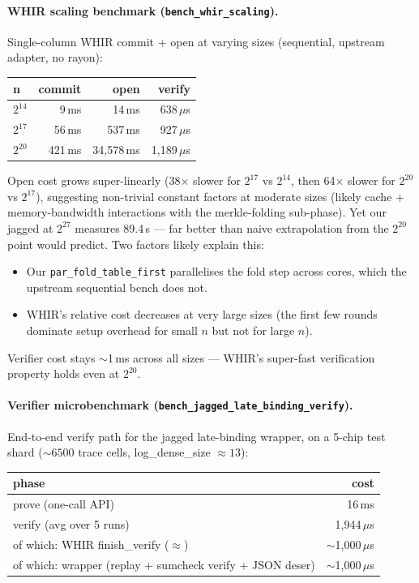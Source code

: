 \paragraph{WHIR scaling benchmark (\texttt{bench\_whir\_scaling}).}
Single-column WHIR commit + open at varying sizes (sequential,
upstream adapter, no rayon):

\begin{tabular}{lrrr}
\toprule
\textbf{n}    & \textbf{commit} & \textbf{open} & \textbf{verify} \\
\midrule
$2^{14}$ &     9\,ms &    14\,ms & 638\,$\mu$s \\
$2^{17}$ &    56\,ms &   537\,ms & 927\,$\mu$s \\
$2^{20}$ &   421\,ms & 34{,}578\,ms & 1{,}189\,$\mu$s \\
\bottomrule
\end{tabular}

Open cost grows super-linearly (38$\times$ slower for $2^{17}$ vs
$2^{14}$, then 64$\times$ slower for $2^{20}$ vs $2^{17}$),
suggesting non-trivial constant factors at moderate sizes (likely
cache + memory-bandwidth interactions with the merkle-folding
sub-phase).  Yet our jagged at $2^{27}$ measures 89.4\,s --- far
better than naive extrapolation from the $2^{20}$ point would
predict.  Two factors likely explain this:

\begin{itemize}
  \item Our \texttt{par\_fold\_table\_first} parallelises the fold
        step across cores, which the upstream sequential bench does
        not.
  \item WHIR's relative cost decreases at very large sizes (the
        first few rounds dominate setup overhead for small $n$ but
        not for large $n$).
\end{itemize}

Verifier cost stays $\sim$1\,ms across all sizes --- WHIR's
super-fast verification property holds even at $2^{20}$.

\paragraph{Verifier microbenchmark
(\texttt{bench\_jagged\_late\_binding\_verify}).}
End-to-end verify path for the jagged late-binding wrapper, on a
5-chip test shard ($\sim 6500$ trace cells, log\_dense\_size $\approx 13$):

\begin{tabular}{lr}
\toprule
\textbf{phase}                                    & \textbf{cost} \\
\midrule
prove (one-call API)                              &     16\,ms \\
verify (avg over 5 runs)                          & 1{,}944\,$\mu$s \\
\quad of which: WHIR finish\_verify ($\approx$)   & $\sim$1{,}000\,$\mu$s \\
\quad of which: wrapper (replay + sumcheck verify + JSON deser) & $\sim$1{,}000\,$\mu$s \\
\bottomrule
\end{tabular}

